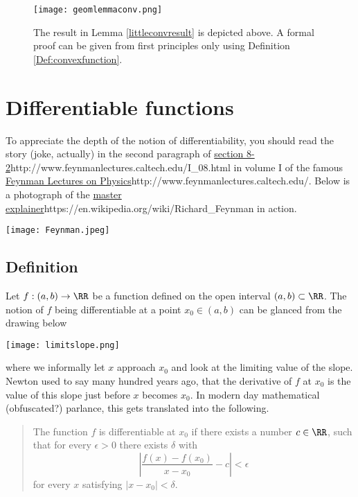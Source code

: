 \documentclass{article}
\begin{document}
\begin{frameit}
\begin{figure}

\texttt{[image: geomlemmaconv.png]}

The result in Lemma \ref{littleconvresult} is depicted above. A formal proof can be
given from first principles only using Definition \ref{Def:convexfunction}.
\end{figure}
\end{frameit}

\section{Differentiable functions}


To appreciate the depth of the notion of differentiability, you should
read the story (joke, actually) in the second paragraph of \url{section
  8-2}{http://www.feynmanlectures.caltech.edu/I_08.html} in volume I
of the famous \url{Feynman Lectures on Physics}{http://www.feynmanlectures.caltech.edu/}. Below is a
  photograph of the \url{master explainer}{https://en.wikipedia.org/wiki/Richard_Feynman} in action.

\texttt{[image: Feynman.jpeg]}

\subsection{Definition}

Let $f:(a, b)\rightarrow \RR$ be a function defined on the open interval $(a, b)\subset \RR$.
The notion of $f$ being differentiable at a point $x_0\in (a, b)$
can be glanced from the drawing below

\texttt{[image: limitslope.png]}

where we informally let $x$ approach $x_0$ and look at the limiting
value of the slope. Newton used to say many hundred years ago, that
the derivative of $f$ at $x_0$ is the value of this slope just before
$x$ becomes $x_0$. In modern day mathematical (obfuscated?) parlance, this
gets translated into the following.

\begin{quote}
  The function $f$ is differentiable at $x_0$ if there exists a number
$c\in \RR$, such that for every $\epsilon > 0$ there exists $\delta$
with
\begin{equation}\label{defdiff0}
  \left| \frac{f(x) - f(x_0)}{x-x_0} - c \right| < \epsilon
\end{equation}
for every $x$ satisfying $|x-x_0 |<\delta$. 
\end{quote}
\end{document}
